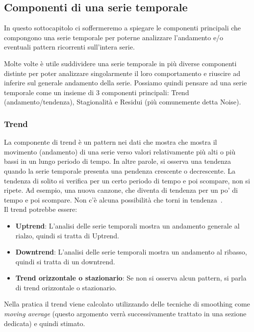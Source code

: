 \subsection{Componenti di una serie temporale}
In questo sottocapitolo ci soffermeremo a spiegare le componenti principali
che compongono una serie temporale per poterne analizzare l'andamento e/o
eventuali pattern ricorrenti sull'intera serie.


Molte volte è utile suddividere una serie temporale in più diverse componenti
distinte per poter analizzare singolarmente il loro comportamento e
riuscire ad inferire sul generale andamento della serie. Possiamo quindi
pensare ad una serie temporale come un insieme di 3 componenti principali:
Trend (andamento/tendenza), Stagionalità e Residui (più comunemente detta Noise).

\subsubsection{Trend}
La componente di trend è un pattern nei dati che mostra che mostra il 
movimento (andamento) di una serie verso valori relativamente più alti o più bassi 
in un lungo periodo di tempo. In altre parole, si osserva una tendenza quando 
la serie temporale presenta una pendenza crescente o decrescente. 
La tendenza di solito si verifica per un certo periodo di tempo 
e poi scompare, non si ripete. Ad esempio, una nuova canzone, 
che diventa di tendenza per un po' di tempo e poi scompare. 
Non c'è alcuna possibilità che torni in tendenza~\cite{gg:trend}.\\
Il trend potrebbe essere:
\begin{itemize}
    \setlength\itemsep{-0.6em}
    \item \textbf{Uptrend}: L'analisi delle serie temporali mostra un andamento generale al rialzo, quindi si tratta di Uptrend.
    \item \textbf{Downtrend}: L'analisi delle serie temporali mostra un andamento al ribasso, quindi si tratta di un downtrend.
    \item \textbf{Trend orizzontale o stazionario}: Se non si osserva alcun pattern, si parla di trend orizzontale o stazionario.
\end{itemize}

Nella pratica il trend viene calcolato utilizzando delle tecniche di smoothing come
\textit{moving average} (questo argomento verrà successivamente trattato in una sezione dedicata)
e quindi stimato.

